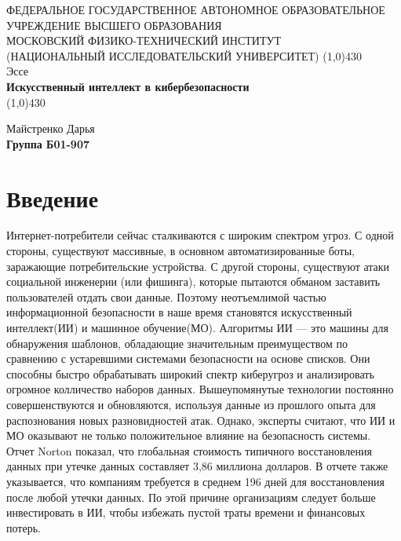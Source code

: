 \documentclass{article}
\begin{document}
\begin{titlepage}
\begin{center}
\large{\small ФЕДЕРАЛЬНОЕ ГОСУДАРСТВЕННОЕ АВТОНОМНОЕ ОБРАЗОВАТЕЛЬНОЕ\\ УЧРЕЖДЕНИЕ ВЫСШЕГО ОБРАЗОВАНИЯ\\ МОСКОВСКИЙ ФИЗИКО-ТЕХНИЧЕСКИЙ ИНСТИТУТ\\ (НАЦИОНАЛЬНЫЙ ИССЛЕДОВАТЕЛЬСКИЙ УНИВЕРСИТЕТ)}
\vfill
\line(1,0){430}\\[1mm]
\huge{Эссе}\\
\huge\textbf{Искусственный интеллект в кибербезопасности}\\
\line(1,0){430}\\[1mm]
\vfill
\begin{flushright}
	\normalsize{Майстренко Дарья}\\
	\normalsize{\textbf{Группа Б01-907}}\\
\end{flushright}
\end{center}
\end{titlepage}

\section*{Введение}
Интернет-потребители сейчас сталкиваются с широким спектром угроз. С одной стороны, существуют массивные, в основном автоматизированные боты, заражающие потребительские устройства. С другой стороны, существуют атаки социальной инженерии (или фишинга), которые пытаются обманом заставить пользователей отдать свои данные. Поэтому неотъемлимой частью информационной безопасности в наше время становятся искусственный интеллект(ИИ) и машинное обучение(МО). Алгоритмы ИИ — это машины для обнаружения шаблонов, обладающие значительным преимуществом по сравнению с устаревшими системами безопасности на основе списков. Они способны быстро обрабатывать широкий спектр киберугроз и анализировать огромное колличество наборов данных. Вышеупомянутые технологии постоянно совершенствуются и обновляются, используя данные из прошлого опыта для распознования новых разновидностей атак. Однако, эксперты считают, что ИИ и МО оказывают не только положительное влияние на безопасность системы. 
Отчет Norton показал, что глобальная стоимость типичного восстановления данных при утечке данных составляет 3,86 миллиона долларов. В отчете также указывается, что компаниям требуется в среднем 196 дней для восстановления после любой утечки данных. По этой причине организациям следует больше инвестировать в ИИ, чтобы избежать пустой траты времени и финансовых потерь.
\end{document}
